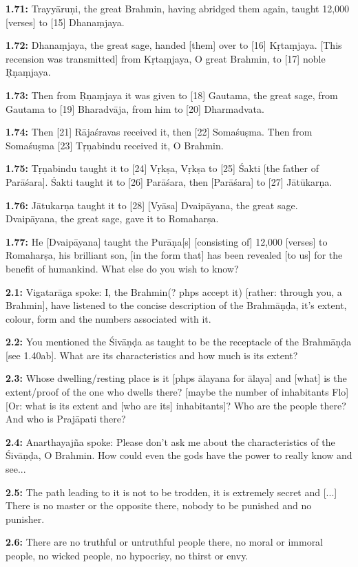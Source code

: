 \documentclass{article}
\newcommand{\vsnum}[1]{\textbf{#1}}
\begin{document}
\vsnum{1.71: }Trayyāruṇi, the great Brahmin, having abridged them again, taught 12,000 [verses] to [15] Dhanaṃjaya.

\vsnum{1.72: }Dhanaṃjaya, the great sage, handed [them] over to [16] Kṛtaṃjaya. [This recension was transmitted] from Kṛtaṃjaya, O great Brahmin, to [17] noble Ṛṇaṃjaya.

\vsnum{1.73: }Then from Ṛṇaṃjaya it was given to [18] Gautama, the great sage, from Gautama to [19] Bharadvāja, from him to [20] Dharmadvata.

\vsnum{1.74: }Then [21] Rājaśravas received it, then [22] Somaśuṣma. Then from Somaśuṣma [23] Tṛṇabindu received it, O Brahmin.

\vsnum{1.75: }Tṛṇabindu taught it to [24] Vṛkṣa, Vṛkṣa to [25] Śakti [the father of Parāśara]. Śakti taught it to [26] Parāśara, then [Parāśara] to [27] Jātūkarṇa.

\vsnum{1.76: }Jātukarṇa taught it to [28] [Vyāsa] Dvaipāyana, the great sage. Dvaipāyana, the great sage, gave it to Romaharṣa.

\vsnum{1.77: }He [Dvaipāyana] taught the Purāṇa[s] [consisting of] 12,000 [verses] to Romaharṣa, his brilliant son, [in the form that] has been revealed [to us] for the benefit of humankind. What else do you wish to know?


\vsnum{2.1: }Vigatarāga spoke: I, the Brahmin(? phps accept it) [rather: through you, a Brahmin], have listened to the concise description of the Brahmāṇḍa, it's extent, colour, form and the numbers associated with it.

\vsnum{2.2: }You mentioned the Śivāṇḍa as taught to be the receptacle of the Brahmāṇḍa [see 1.40ab]. What are its characteristics and how much is its extent?

\vsnum{2.3: }Whose dwelling/resting place is it [phps ālayana for ālaya] and [what] is the extent/proof of the one who dwells there? [maybe the number of inhabitants Flo] [Or: what is its extent and [who are its] inhabitants]? Who are the people there? And who is Prajāpati there?

\vsnum{2.4: }Anarthayajña spoke: Please don't ask me about the characteristics of the Śivāṇḍa, O Brahmin. How could even the gods have the power to really know and see...

\vsnum{2.5: }The path leading to it is not to be trodden, it is extremely secret and [...] There is no master or the opposite there, nobody to be punished and no punisher.

\vsnum{2.6: }There are no truthful or untruthful people there, no moral or immoral people, no wicked people, no hypocrisy, no thirst or envy.
\end{document}
